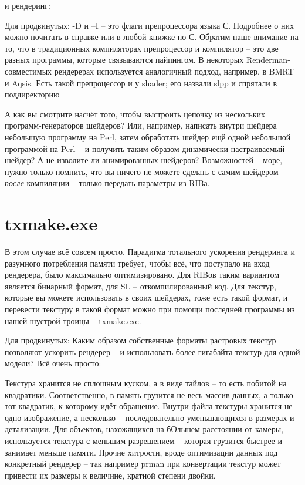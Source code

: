  и рендеринг:
  

  

 Для
    продвинутых: -D и –I – это флаги
    препроцессора языка С. Подробнее о них можно почитать в справке или
    в любой книжке по С. Обратим наше внимание на то, что в
    традиционных компиляторах препроцессор и компилятор – это две
    разных программы, которые связываются пайпингом. В некоторых
    Renderman-совместимых рендерерах используется аналогичный подход,
    например, в BMRT и Aqsis. Есть такой препроцессор и у shader; его
    назвали slpp и спрятали в
    поддиректорию %
  

 А как вы смотрите насчёт того, чтобы выстроить
    цепочку из нескольких программ-генераторов шейдеров? Или, например,
    написать внутри шейдера небольшую программу на Perl, затем
    обработать шейдер ещё одной небольшой программой на Perl – и
    получить таким образом динамически настраиваемый шейдер? А не
    изволите ли анимированных шейдеров? Возможностей – море, нужно
    только помнить, что вы ничего не можете сделать с самим шейдером {\it после} компиляции – только
    передать параметры из RIBа.

  \section*{txmake.exe}
  

 В этом случае всё совсем просто. Парадигма
    тотального ускорения рендеринга и разумного потребления памяти
    требует, чтобы всё, что поступало на вход рендерера, было
    максимально оптимизировано. Для RIBов таким вариантом является
    бинарный формат, для SL – откомпилированный код. Для текстур,
    которые вы можете использовать в своих шейдерах, тоже есть такой
    формат, и перевести текстуру в такой формат можно при помощи
    последней программы из нашей шустрой троицы –
    txmake.exe.
  

 Для
    продвинутых: Каким образом
    собственные форматы растровых текстур позволяют ускорить рендерер –
    и использовать более гигабайта текстур для одной модели? Всё очень
    просто:
  
     Текстура
      хранится не сплошным куском, а в виде тайлов – то есть побитой на
      квадратики. Соответственно, в память грузится не весь массив
      данных, а только тот квадратик, к которому идёт
      обращение.
     Внутри файла
      текстуры хранится не одно изображение, а несколько –
      последовательно уменьшающихся в размерах и детализации. Для
      объектов, нахожящихся на бОльшем расстоянии от камеры, используется
      текстура с меньшим разрешением – которая грузится быстрее и
      занимает меньше памяти.
     Прочие
      хитрости, вроде оптимизации данных под конкретный рендерер – так
      например prman при
      конвертации текстур может привести их размеры к величине, кратной
      степени двойки.
  

